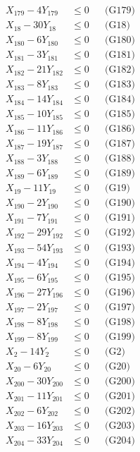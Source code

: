 \documentclass[a4paper,10pt]{article}
\begin{document}
{\begin{align}
X_{179} - 4Y_{179} &\leq 0 && \text{(G179)} \\
X_{18} - 30Y_{18} &\leq 0 && \text{(G18)} \\
X_{180} - 6Y_{180} &\leq 0 && \text{(G180)} \\
X_{181} - 3Y_{181} &\leq 0 && \text{(G181)} \\
X_{182} - 21Y_{182} &\leq 0 && \text{(G182)} \\
X_{183} - 8Y_{183} &\leq 0 && \text{(G183)} \\
X_{184} - 14Y_{184} &\leq 0 && \text{(G184)} \\
X_{185} - 10Y_{185} &\leq 0 && \text{(G185)} \\
X_{186} - 11Y_{186} &\leq 0 && \text{(G186)} \\
X_{187} - 19Y_{187} &\leq 0 && \text{(G187)} \\
X_{188} - 3Y_{188} &\leq 0 && \text{(G188)} \\
\allowbreak
X_{189} - 6Y_{189} &\leq 0 && \text{(G189)} \\
X_{19} - 11Y_{19} &\leq 0 && \text{(G19)} \\
X_{190} - 2Y_{190} &\leq 0 && \text{(G190)} \\
X_{191} - 7Y_{191} &\leq 0 && \text{(G191)} \\
X_{192} - 29Y_{192} &\leq 0 && \text{(G192)} \\
X_{193} - 54Y_{193} &\leq 0 && \text{(G193)} \\
X_{194} - 4Y_{194} &\leq 0 && \text{(G194)} \\
X_{195} - 6Y_{195} &\leq 0 && \text{(G195)} \\
X_{196} - 27Y_{196} &\leq 0 && \text{(G196)} \\
X_{197} - 2Y_{197} &\leq 0 && \text{(G197)} \\
X_{198} - 8Y_{198} &\leq 0 && \text{(G198)} \\
X_{199} - 8Y_{199} &\leq 0 && \text{(G199)} \\
X_{2} - 14Y_{2} &\leq 0 && \text{(G2)} \\
X_{20} - 6Y_{20} &\leq 0 && \text{(G20)} \\
X_{200} - 30Y_{200} &\leq 0 && \text{(G200)} \\
X_{201} - 11Y_{201} &\leq 0 && \text{(G201)} \\
X_{202} - 6Y_{202} &\leq 0 && \text{(G202)} \\
X_{203} - 16Y_{203} &\leq 0 && \text{(G203)} \\
X_{204} - 33Y_{204} &\leq 0 && \text{(G204)} \\

\end{align}}
\end{document}
